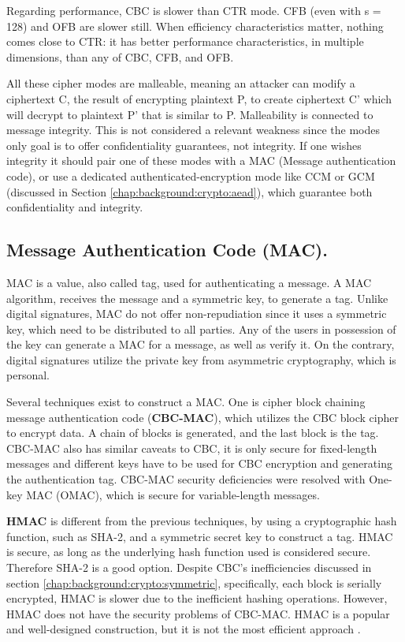 Regarding performance, CBC is slower than CTR mode. CFB (even with s = 128) and OFB are slower still.
When efficiency characteristics matter, nothing comes close to CTR: it has better performance characteristics, in multiple dimensions, than any of CBC, CFB, and OFB.

All these cipher modes are malleable, meaning an attacker can modify a ciphertext C, the result of encrypting plaintext P, to create ciphertext C' which will decrypt to plaintext P' that is similar to P. Malleability is connected to message integrity. This is not considered a relevant weakness since the modes only goal is to offer confidentiality guarantees, not integrity. If one wishes integrity it should pair one of these modes with a MAC (Message authentication code), or use a dedicated authenticated-encryption mode like CCM or GCM (discussed in Section \ref{chap:background:crypto:aead}), which guarantee both confidentiality and integrity.

\subsection{Message Authentication Code (MAC).}  \label{chap:background:crypto:mac}

MAC is a value, also called tag, used for authenticating a message.
A MAC algorithm, receives the message and a symmetric key, to generate a tag. Unlike digital signatures, MAC do not offer non-repudiation since it uses a symmetric key, which need to be distributed to all parties. Any of the users in possession of the key can generate a MAC for a message, as well as verify it. On the contrary, digital signatures utilize the private key from asymmetric cryptography, which is personal.

Several techniques exist to construct a MAC. One is cipher block chaining message authentication code (\textbf{CBC-MAC}), which utilizes the CBC block cipher to encrypt data. A chain of blocks is generated, and the last block is the tag.
CBC-MAC also has similar caveats to CBC, it is only secure for fixed-length messages \cite{aesmodes} and different keys have to be used for CBC encryption and generating the authentication tag. 
CBC-MAC security deficiencies were resolved with One-key MAC (OMAC), which is secure for variable-length messages.

\textbf{HMAC} is different from the previous techniques, by using a cryptographic hash function, such as SHA-2, and a symmetric secret key to construct a tag. HMAC is secure, as long as the underlying hash function used is considered secure. Therefore SHA-2 is a good option.
Despite CBC's inefficiencies discussed in section \ref{chap:background:crypto:symmetric}, specifically, each block is serially encrypted, HMAC is slower due to the inefficient hashing operations. However, HMAC does not have the security problems of CBC-MAC. HMAC is a popular and well-designed construction, but it is not the most efficient approach \cite{aesmodes}.


